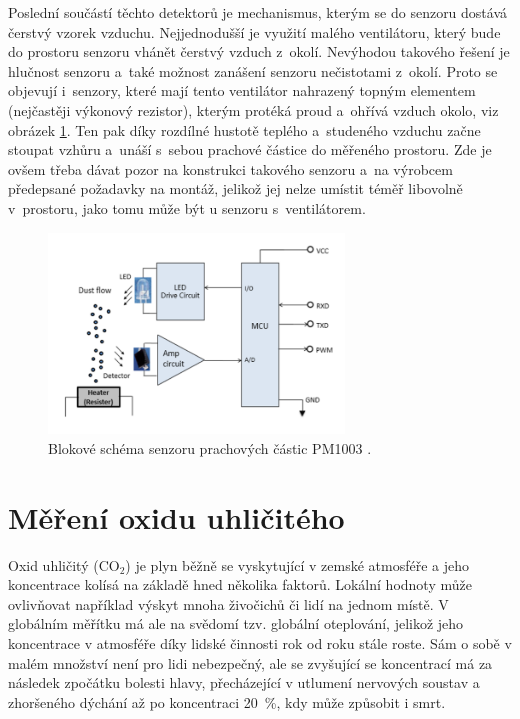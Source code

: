 Poslední součástí těchto detektorů je mechanismus, kterým se do senzoru dostává čerstvý vzorek vzduchu. Nejjednodušší je využití malého ventilátoru, který bude do prostoru senzoru vhánět čerstvý vzduch z~okolí. Nevýhodou takového řešení je hlučnost senzoru a~také možnost zanášení senzoru nečistotami z~okolí. Proto se objevují i~senzory, které mají tento ventilátor nahrazený topným elementem (nejčastěji výkonový rezistor), kterým protéká proud a~ohřívá vzduch okolo, viz obrázek \ref{fig_dustSensorPrinciple}. Ten pak díky rozdílné hustotě teplého a~studeného vzduchu začne stoupat vzhůru a~unáší s~sebou prachové částice do měřeného prostoru. Zde je ovšem třeba dávat pozor na konstrukci takového senzoru a~na výrobcem předepsané požadavky na montáž, jelikož jej nelze umístit téměř libovolně v~prostoru, jako tomu může být u senzoru s~ventilátorem. \cite{teor_DustSens}\cite{teor_PMMeas}

\begin{figure}
    \centering
    \includegraphics[width=0.70\textwidth]{obrazky/dustSensorPrinciple.png}
    \caption[Blokové schéma senzoru prachových částic PM1003.]{Blokové schéma senzoru prachových částic PM1003 \cite{PM1003Datasheet}.}
    \label{fig_dustSensorPrinciple}
\end{figure}

\section{Měření oxidu uhličitého}

Oxid uhličitý (CO$_2$) je plyn běžně se vyskytující v zemské atmosféře a jeho koncentrace kolísá na základě hned několika faktorů. Lokální hodnoty může ovlivňovat například výskyt mnoha živočichů či lidí na jednom místě. V globálním měřítku má ale na svědomí tzv. globální oteplování, jelikož jeho koncentrace v atmosféře díky lidské činnosti rok od roku stále roste. Sám o sobě v malém množství není pro lidi nebezpečný, ale se zvyšující se koncentrací má za následek zpočátku bolesti hlavy, přecházející v utlumení nervových soustav a zhoršeného dýchání až po koncentraci 20~\%, kdy může způsobit i smrt. \cite{teor_COMeas}

